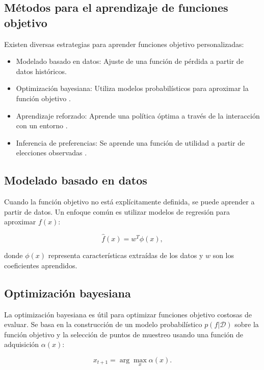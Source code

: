 \begin{itemize}
		\subsection{Métodos para el aprendizaje de funciones objetivo}
		
		Existen diversas estrategias para aprender funciones objetivo personalizadas:
		
		\begin{itemize}
			\item Modelado basado en datos: Ajuste de una función de pérdida a partir de datos históricos.
			\item Optimización bayesiana: Utiliza modelos probabilísticos para aproximar la función objetivo \cite{frazier2018tutorial}.
			\item Aprendizaje reforzado: Aprende una política óptima a través de la interacción con un entorno \cite{sutton2018reinforcement}.
			\item Inferencia de preferencias: Se aprende una función de utilidad a partir de elecciones observadas \cite{boutilier2006preference}.
		\end{itemize}
		
		\subsection{Modelado basado en datos}
		
		Cuando la función objetivo no está explícitamente definida, se puede aprender a partir de datos. Un enfoque común es utilizar modelos de regresión para aproximar \( f(x) \):
		
		\begin{equation}
			\hat{f}(x) = w^T \phi(x),
		\end{equation}
		
		donde \( \phi(x) \) representa características extraídas de los datos y \( w \) son los coeficientes aprendidos.
		
		\subsection{Optimización bayesiana}
		
		La optimización bayesiana es útil para optimizar funciones objetivo costosas de evaluar. Se basa en la construcción de un modelo probabilístico \( p(f | \mathcal{D}) \) sobre la función objetivo y la selección de puntos de muestreo usando una función de adquisición \( \alpha(x) \):
		
		\begin{equation}
			x_{t+1} = \arg \max_x \alpha(x).
		\end{equation}
		

\end{itemize}
